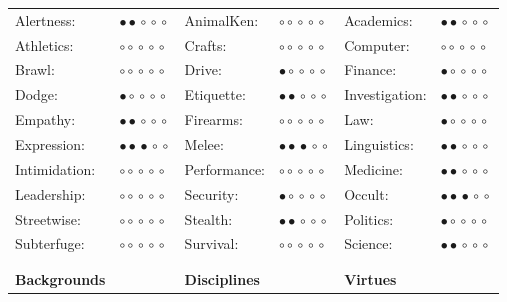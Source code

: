 \documentclass[a4paper,13pt]{scrartcl}
\begin{document}
\begin{table}
\begin{tabular}{ >{\RaggedLeft}p{25mm} >{\RaggedRight}p{25mm} >{\RaggedLeft}p{25mm}  >{\RaggedRight}p{25mm} >{\RaggedLeft}p{25mm} >{\RaggedRight}p{25mm}}
		Alertness:			& 	$\bullet\!\bullet\!\circ\!\circ\!\circ$		&
		AnimalKen:  		&	$\circ\!\circ\!\circ\!\circ\!\circ$			&
		Academics: 			& 	$\bullet\!\bullet\!\circ\!\circ\!\circ$		\\
		Athletics:			&	$\circ\!\circ\!\circ\!\circ\!\circ$ 		&
		Crafts:   			&	$\circ\!\circ\!\circ\!\circ\!\circ$ 		&
		Computer:			&	$\circ\!\circ\!\circ\!\circ\!\circ$			\\
		Brawl: 				&	$\circ\!\circ\!\circ\!\circ\!\circ$			&
		Drive: 	  			&	$\bullet\!\circ\!\circ\!\circ\!\circ$ 		&
		Finance: 			&	$\bullet\!\circ\!\circ\!\circ\!\circ$		\\
		Dodge:				&	$\bullet\!\circ\!\circ\!\circ\!\circ$ 		&
		Etiquette:			&	$\bullet\!\bullet\!\circ\!\circ\!\circ$ 	&
		Investigation:		&	$\bullet\!\bullet\!\circ\!\circ\!\circ$		\\
		Empathy: 			&	$\bullet\!\bullet\!\circ\!\circ\!\circ$  	&
		Firearms:			&	$\circ\!\circ\!\circ\!\circ\!\circ$ 		&
		Law: 				&	$\bullet\!\circ\!\circ\!\circ\!\circ$		\\
		Expression: 		&	$\bullet\!\bullet\!\bullet\!\circ\!\circ$ 	&
		Melee:				& 	$\bullet\!\bullet\!\bullet\!\circ\!\circ$ 	&
		Linguistics: 		&  	$\bullet\!\bullet\!\circ\!\circ\!\circ$		\\
		Intimidation:		& 	$\circ\!\circ\!\circ\!\circ\!\circ$ 		&
		Performance:		& 	$\circ\!\circ\!\circ\!\circ\!\circ$ 		&
		Medicine: 			&	$\bullet\!\bullet\!\circ\!\circ\!\circ$		\\
		Leadership:			&	$\circ\!\circ\!\circ\!\circ\!\circ$ 		&
		Security: 			&	$\bullet\!\circ\!\circ\!\circ\!\circ$		&
		Occult: 			&	$\bullet\!\bullet\!\bullet\!\circ\!\circ$	\\
		Streetwise: 		&	$\circ\!\circ\!\circ\!\circ\!\circ$ 		&
		Stealth: 			&	$\bullet\!\bullet\!\circ\!\circ\!\circ$ 	&
		Politics: 			&	$\bullet\!\circ\!\circ\!\circ\!\circ$		\\
		Subterfuge: 		&	$\circ\!\circ\!\circ\!\circ\!\circ$ 		&
		Survival: 			&	$\circ\!\circ\!\circ\!\circ\!\circ$			&
		Science: 			&	$\bullet\!\bullet\!\circ\!\circ\!\circ$		\\

	 & &&& &\\
	&& & & &\\

		\textbf{Backgrounds}& 												&
		\textbf{Disciplines}&												&
		\textbf{Virtues} 	&												\\


\end{tabular}
\end{table}
\end{document}
